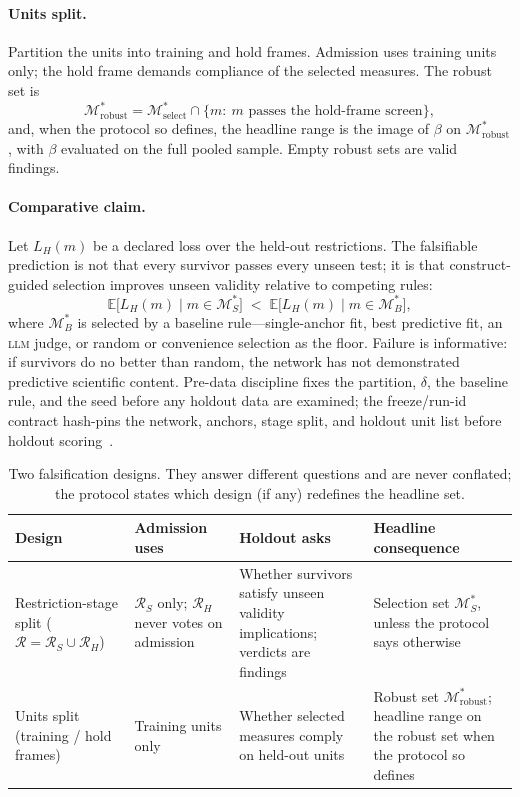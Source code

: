 \documentclass[10pt,letterpaper]{article}
\newcommand{\LLM}{\textsc{llm}}
\newcommand{\M}{\ensuremath{\mathcal{M}}}
\newcommand{\E}{\mathbb{E}}
\newcommand{\Rset}{\mathcal{R}}
\begin{document}
\paragraph{Units split.}
Partition the units into training and hold frames.
Admission uses training units only; the hold frame demands compliance of the selected measures.
The robust set is
\begin{equation}
\M^*_{\mathrm{robust}}=\M^*_{\mathrm{select}}\cap\bigl\{m:\ \text{$m$ passes the hold-frame screen}\bigr\},
\label{eq:Mrobust}
\end{equation}
and, when the protocol so defines, the headline range is the image of $\beta$ on $\M^*_{\mathrm{robust}}$, with $\beta$ evaluated on the full pooled sample.
Empty robust sets are valid findings.

\paragraph{Comparative claim.}
Let $L_H(m)$ be a declared loss over the held-out restrictions.
The falsifiable prediction is not that every survivor passes every unseen test; it is that construct-guided selection improves unseen validity relative to competing rules:
\begin{equation}
\E\bigl[L_H(m)\mid m\in\M^*_S\bigr]
\;<\;
\E\bigl[L_H(m)\mid m\in\M^*_B\bigr],
\label{eq:falsifiable}
\end{equation}
where $\M^*_B$ is selected by a baseline rule---single-anchor fit, best predictive fit, an \LLM{} judge, or random or convenience selection as the floor.
Failure is informative: if survivors do no better than random, the network has not demonstrated predictive scientific content.
Pre-data discipline fixes the partition, $\delta$, the baseline rule, and the seed before any holdout data are examined; the freeze/run-id contract hash-pins the network, anchors, stage split, and holdout unit list before holdout scoring~\cite{cvprofiles}.

\begin{table}[t]
\centering
\small
\caption{Two falsification designs.
They answer different questions and are never conflated; the protocol states which design (if any) redefines the headline set.}
\label{tab:designs}
\begin{tabularx}{\textwidth}{@{}>{\raggedright\arraybackslash}p{2.9cm} X X X@{}}
\toprule
\textbf{Design} & \textbf{Admission uses} & \textbf{Holdout asks} & \textbf{Headline consequence} \\
\midrule
Restriction-stage split ($\Rset=\Rset_S\cup\Rset_H$) & $\Rset_S$ only; $\Rset_H$ never votes on admission & Whether survivors satisfy unseen validity implications; verdicts are findings & Selection set $\M^*_S$, unless the protocol says otherwise \\
Units split (training / hold frames) & Training units only & Whether selected measures comply on held-out units & Robust set $\M^*_{\mathrm{robust}}$; headline range on the robust set when the protocol so defines \\
\bottomrule
\end{tabularx}
\end{table}
\end{document}
